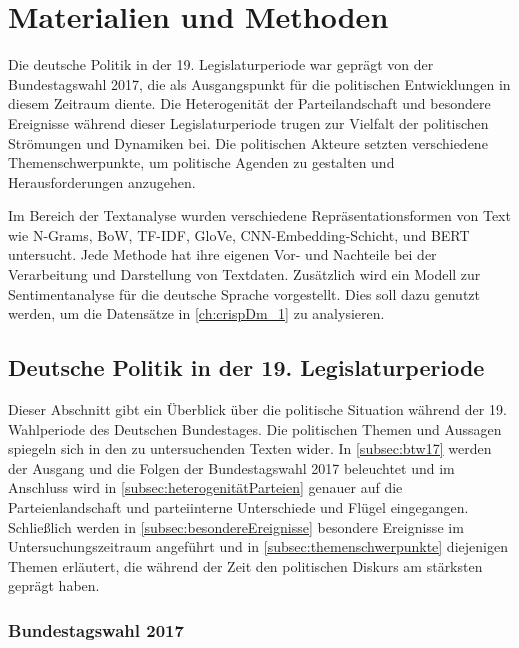 
\chapter{Materialien und Methoden} \label{ch:materialsAndMethods}

Die deutsche Politik in der 19. Legislaturperiode war geprägt von der Bundestagswahl 2017, die als Ausgangspunkt für die politischen Entwicklungen in diesem Zeitraum diente. Die Heterogenität der Parteilandschaft und besondere Ereignisse während dieser Legislaturperiode trugen zur Vielfalt der politischen Strömungen und Dynamiken bei. Die politischen Akteure setzten verschiedene Themenschwerpunkte, um politische Agenden zu gestalten und Herausforderungen anzugehen.

Im Bereich der Textanalyse wurden verschiedene Repräsentationsformen von Text wie N-Grams, \ac{BoW}, \ac{TF-IDF}, \ac{GloVe}, \ac{CNN}-Embedding-Schicht, \ft und \ac{BERT} untersucht. Jede Methode hat ihre eigenen Vor- und Nachteile bei der Verarbeitung und Darstellung von Textdaten. Zusätzlich wird ein Modell zur Sentimentanalyse für die deutsche Sprache vorgestellt. Dies soll dazu genutzt werden, um die Datensätze in \autoref{ch:crispDm_1} zu analysieren.

\section{Deutsche Politik in der 19. Legislaturperiode}

Dieser Abschnitt gibt ein Überblick über die politische Situation während der \num{19}. Wahlperiode des Deutschen Bundestages. Die politischen Themen und Aussagen spiegeln sich in den zu untersuchenden Texten wider. In \autoref{subsec:btw17} werden der Ausgang und die Folgen der Bundestagswahl \num{2017} beleuchtet und im Anschluss wird in \autoref{subsec:heterogenitätParteien} genauer auf die Parteienlandschaft und parteiinterne Unterschiede und Flügel eingegangen. Schließlich werden in \autoref{subsec:besondereEreignisse} besondere Ereignisse im Untersuchungszeitraum angeführt und in \autoref{subsec:themenschwerpunkte} diejenigen Themen erläutert, die während der Zeit den politischen Diskurs am stärksten geprägt haben.

\subsection{Bundestagswahl \num{2017}} \label{subsec:btw17}

